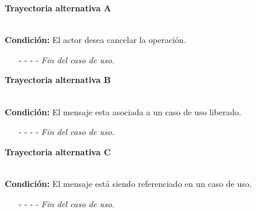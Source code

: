 \hypertarget{CU9-3:TAA}{\textbf{Trayectoria alternativa A}}\\
\noindent \textbf{Condición:} El actor desea cancelar la operación.
\begin{enumerate}
	\UCpaso[\UCactor] Oprime el botón  de la pantalla emergente.
	\UCpaso[\UCsist] Muestra la pantalla .
	\item[- -] - - {\em {Fin del caso de uso}}.%
\end{enumerate}		
\hypertarget{CU9-3:TAB}{\textbf{Trayectoria alternativa B}}\\
\noindent \textbf{Condición:} El mensaje esta asociada a un caso de uso liberado.
\begin{enumerate}
	\UCpaso[\UCsist] Oculta el botón \eliminar del mensaje que esta asociado a casos de uso liberados de la pantalla .
	\item[- -] - - {\em {Fin del caso de uso}}.%
\end{enumerate}
\hypertarget{CU9-3:TAC}{\textbf{Trayectoria alternativa C}}\\
\noindent \textbf{Condición:} El mensaje está siendo referenciado en un caso de uso.
\begin{enumerate}
	\UCpaso[\UCsist] Muestra el mensaje  en la pantalla  en una pantalla emergente con la lista de casos de uso que están referenciando al mensaje.
	\UCpaso[\UCactor] Oprime el botón  de la pantalla emergente.
	\UCpaso[\UCsist] Muestra la pantalla .
	\item[- -] - - {\em {Fin del caso de uso}}.%
\end{enumerate}	

